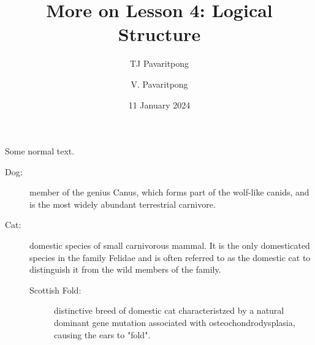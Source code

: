 \documentclass{article}
\begin{document}
\author{TJ Pavaritpong \and V. Pavaritpong}
\title{More on Lesson 4: Logical Structure}
\date{11 January 2024}
\maketitle


Some normal text.

\begin{description}

\item[Dog:] member of the genius Canus, which forms part of the wolf-like canids, and is the most widely abundant terrestrial carnivore.
\item[Cat:] domestic species of small carnivorous mammal. It is the only domesticated species in the family Felidae and is often referred to as the domestic cat to distinguish it from the wild members of the family.
\begin{description}
	\item[Scottish Fold:] distinctive breed of domestic cat characteristzed by a natural dominant gene mutation associated with osteochondrodysplasia, causing the ears to "fold".
\end{description}

\end{description}
\end{document}
